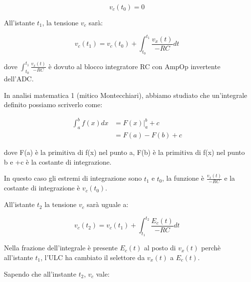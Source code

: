 {
    \Large 
    \begin{equation}
        v_c(t_0) = 0
    \end{equation}
}

All'istante $t_1$, la tensione $v_c$ sarà: 

{
    \Large 
    \begin{equation}
        v_c(t_1) = v_c(t_0) + \int_{t_0}^{t_1} \frac{v_x(t)}{-RC} dt
    \end{equation}
}

dove $\int_{t_0}^{t_1} \frac{v_x(t)}{-RC}$ è dovuto al blocco integratore RC con AmpOp invertente dell'ADC. \newline 

\begin{tcolorbox}
    In analisi matematica 1 (mitico Montecchiari), abbiamo studiato che un'integrale definito possiamo scriverlo come: 

    {
        \Large 
        \begin{equation}
            \begin{split}
            \int_{a}^{b} f(x) dx
            &=
            \left.
            F(x)
            \right|_{a}^{b} + c
            \\
            &=
            F(a) - F(b) + c
            \end{split}
        \end{equation}
    }

    dove F(a) è la primitiva di f(x) nel punto a, F(b) è la primitiva di f(x) nel punto b e +c è la costante di integrazione. \newline 

    In questo caso gli estremi di integrazione sono $t_1$ e $t_0$, la funzione è $\frac{v_x(t)}{-RC}$ 
    e la costante di integrazione è $v_c(t_0)$. 
\end{tcolorbox}

All'istante $t_2$ la tensione $v_c$ sarà uguale a:

{
    \Large 
    \begin{equation}
        v_c(t_2)
        = 
        v_c(t_1)
        + 
        \int_{t_1}^{t_2} \frac{E_c (t)}{-RC} dt   
    \end{equation}
}

Nella frazione dell'integrale è presente $E_c (t)$ al posto di $v_x (t)$ perchè all'istante $t_1$, 
l'ULC ha cambiato il selettore da $v_x(t)$ a $E_c(t)$. \newline 

Sapendo che all'instante $t_2$, $v_c$ vale: 

